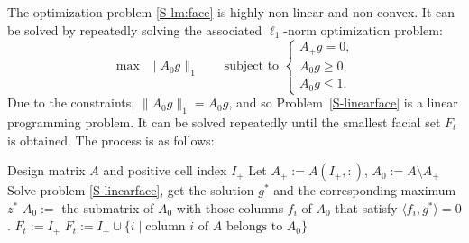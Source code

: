 \documentclass[aos,noinfoline]{imsart}
\def\<{\langle}
\def\>{\rangle}
\theoremstyle{remark}
\theoremstyle{definition}
\begin{document}
The optimization problem \eqref{S-lm:face} is highly non-linear and non-convex.  It can be solved by repeatedly solving the associated $\ell_1$-norm optimization problem:
\begin{equation}
   \label{S-linearface}
   \max \; \lVert A_0g \rVert_1 %
   \qquad\text{subject to }
   \begin{cases}
     A_{+} g=0, \\ %
     A_0 g \ge 0, \\ %
     A_0g \le 1.
   \end{cases}
 \end{equation}
 Due to the constraints, $\lVert A_0g \rVert_1 = A_{0}g$, and so Problem~\eqref{S-linearface} is a linear programming
 problem.  It can be solved repeatedly until the smallest facial set $F_t$ is obtained. The process is as follows:
\begin{algorithm}
\caption{Computing $F_{t}$ Linear Programming}
\begin{algorithmic}
\REQUIRE Design matrix $A$ and positive cell index $I_{+}$
\STATE Let $A_{+}:=A(I_{+},:)$, $A_{0}:=A\setminus A_{+}$
\REPEAT{}
\STATE Solve problem \eqref{S-linearface}, get the solution $g^*$ and the corresponding maximum $z^*$
\STATE $A_{0} :=$  the submatrix of $A_0$ with those columns $f_{i}$ of $A_0$ that satisfy $\<f_i,g^*\> =0$.
\STATE $F_t:=I_{+}$
\ENDIF
{}
\STATE $F_t:=I_{+}\cup \big\{i \;\big|\; \text{column }i\text{ of $A$ belongs to }A_0\big\}$
\ENDIF
\end{algorithmic}
\end{algorithm}

\end{document}
